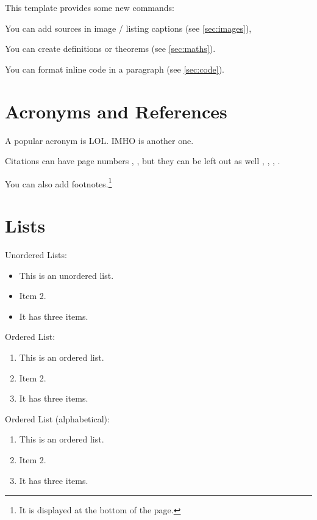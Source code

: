 This template provides some new commands:

You can add sources in image / listing captions (see \autoref{sec:images}), 

You can create definitions or theorems (see \autoref{sec:maths}).

You can format inline code in a paragraph (see \autoref{sec:code}).

\section{Acronyms and References}

A popular acronym is \acs{LOL}. \acf{IMHO} is another one. 
	
Citations can have page numbers \cite[p. 473]{smi:60}, \cite[pp. 359 - 360]{doe:16}, but they can be left out as well \cite{wai:99}, \cite{mus:16}, \cite{wri:81}, \cite{stu:89}.

You can also add footnotes.\footnote{It is displayed at the bottom of the page.}

\pagebreak

\section{Lists}

Unordered Lists:
\begin{itemize}
\item This is an unordered list. 
\item Item 2.
\item It has three items.
\end{itemize}

Ordered List:
\begin{enumerate}
\item This is an ordered list.
\item Item 2.
\item It has three items.
\end{enumerate}

Ordered List (alphabetical):
\begin{enumerate}[label=\Alph*.]
\item This is an ordered list.
\item Item 2.
\item It has three items.
\end{enumerate}

